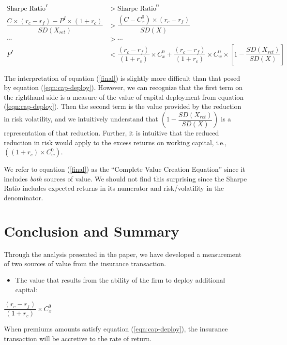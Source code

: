 \documentclass[
]{article}
\providecommand{\tightlist}{%
  \setlength{\itemsep}{0pt}\setlength{\parskip}{0pt}}
\begin{document}
\begin{align}
\nonumber \text{Sharpe Ratio}^I &> \text{Sharpe Ratio}^0\\
\nonumber \dfrac{C\times (r_c-r_f)-P^{I} \times(1 + r_c)}{SD(X_{ret})} &> \dfrac{(C-C_{x}^{0})\times (r_c-r_f)}{SD(X)}\\
\cdots &> \cdots\\
P^{I} &< \dfrac{(r_c-r_f)}{(1 + r_c)} \times C_{x}^{0} + \dfrac{(r_c-r_f)}{(1 + r_c)} \times C_{w}^{0} \times \left[1 - \dfrac{SD(X_{ret})}{SD(X)}\right] \label{final}
\end{align}

The interpretation of equation (\ref{final}) is slightly more difficult
than that posed by equation (\ref{eqn:cap-deploy}). However, we can
recognize that the first term on the righthand side is a measure of the
value of capital deployment from equation (\ref{eqn:cap-deploy}). Then
the second term is the value provided by the reduction in risk
volatility, and we intuitively understand that
\((1 - \dfrac{SD(X_{ret})}{SD(X)})\) is a representation of that
reduction. Further, it is intuitive that the reduced reduction in risk
would apply to the excess returns on working capital, i.e.,
\(((1 + r_c) \times C_{w}^{0})\).

We refer to equation (\ref{final}) as the ``Complete Value Creation
Equation'' since it includes \emph{both} sources of value. We should not
find this surprising since the Sharpe Ratio includes expected returns in
its numerator and risk/volatility in the denominator.

\hypertarget{conclusion-and-summary}{%
\section{Conclusion and Summary}\label{conclusion-and-summary}}

Through the analysis presented in the paper, we have developed a
measurement of two sources of value from the insurance transaction.

\begin{itemize}
\tightlist
\item
  The value that results from the ability of the firm to deploy
  additional capital:
\end{itemize}

\(\dfrac{(r_c-r_f)}{(1 + r_c)} \times C_{x}^{0}\)

When premiums amounts satisfy equation (\ref{eqn:cap-deploy}), the
insurance transaction will be accretive to the rate of return.
\end{document}
